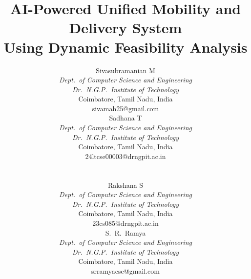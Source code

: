 \documentclass[conference]{IEEEtran}
\begin{document}
\title{AI-Powered Unified Mobility and Delivery System\\ Using Dynamic Feasibility Analysis}

\author{%
\begin{minipage}{0.48\linewidth}\centering
Sivasubramanian M\\
\textit{Dept.\ of Computer Science and Engineering}\\
\textit{Dr.\ N.G.P.\ Institute of Technology}\\
Coimbatore, Tamil Nadu, India\\
sivamah25@gmail.com
\end{minipage}%
\begin{minipage}{0.48\linewidth}\centering
Sadhana T\\
\textit{Dept.\ of Computer Science and Engineering}\\
\textit{Dr.\ N.G.P.\ Institute of Technology}\\
Coimbatore, Tamil Nadu, India\\
24ltcse00003@drngpit.ac.in
\end{minipage}%
\\[1.0em]
\begin{minipage}{0.48\linewidth}\centering
Rakshana S\\
\textit{Dept.\ of Computer Science and Engineering}\\
\textit{Dr.\ N.G.P.\ Institute of Technology}\\
Coimbatore, Tamil Nadu, India\\
23cs085@drngpit.ac.in
\end{minipage}%
\begin{minipage}{0.48\linewidth}\centering
S.\ R.\ Ramya\\
\textit{Dept.\ of Computer Science and Engineering}\\
\textit{Dr.\ N.G.P.\ Institute of Technology}\\
Coimbatore, Tamil Nadu, India\\
srramyacse@gmail.com
\end{minipage}%
}

\maketitle
\end{document}

